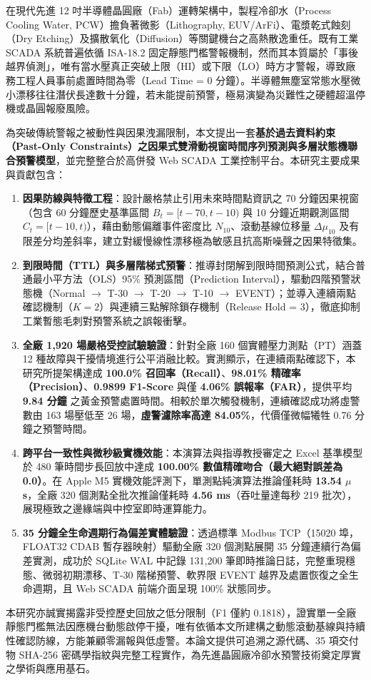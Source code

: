 \documentclass[fontset=none, a4paper, 12pt]{ctexart}
\begin{document}
{\fontsize{12}{20}\selectfont
在現代先進 12 吋半導體晶圓廠（Fab）運轉架構中，製程冷卻水（Process Cooling Water, PCW）擔負著微影（Lithography, EUV/ArFi）、電漿乾式蝕刻（Dry Etching）及擴散氧化（Diffusion）等關鍵機台之高熱散逸重任。既有工業 SCADA 系統普遍依循 ISA-18.2 固定靜態門檻警報機制，然而其本質屬於「事後越界偵測」，唯有當水壓真正突破上限（HI）或下限（LO）時方才警報，導致廠務工程人員事前處置時間為零（Lead Time = 0 分鐘）。半導體無塵室常態水壓微小漂移往往潛伏長達數十分鐘，若未能提前預警，極易演變為災難性之硬體超溫停機或晶圓報廢風險。

為突破傳統警報之被動性與因果洩漏限制，本文提出一套\textbf{基於過去資料約束（Past-Only Constraints）之因果式雙滑動視窗時間序列預測與多層狀態機聯合預警模型}，並完整整合於高併發 Web SCADA 工業控制平台。本研究主要成果與貢獻包含：
\begin{enumerate}
    \item \textbf{因果防線與特徵工程}：設計嚴格禁止引用未來時間點資訊之 70 分鐘因果視窗（包含 60 分鐘歷史基準區間 $B_t=[t-70, t-10)$ 與 10 分鐘近期觀測區間 $C_t=[t-10, t)$），藉由動態偏離事件密度比 $N_{10}$、滾動基線位移量 $\Delta\mu_{10}$ 及有限差分均差斜率，建立對緩慢線性漂移極為敏感且抗高斯噪聲之因果特徵集。
    \item \textbf{到限時間（TTL）與多層階梯式預警}：推導封閉解到限時間預測公式，結合普通最小平方法（OLS）95\% 預測區間（Prediction Interval），驅動四階預警狀態機（Normal $\to$ T-30 $\to$ T-20 $\to$ T-10 $\to$ EVENT）；並導入連續兩點確認機制（$K=2$）與連續三點解除鎖存機制（Release Hold = 3），徹底抑制工業暫態毛刺對預警系統之誤報衝擊。
    \item \textbf{全廠 1,920 場嚴格受控試驗驗證}：針對全廠 160 個實體壓力測點（PT）涵蓋 12 種故障與干擾情境進行公平消融比較。實測顯示，在連續兩點確認下，本研究所提架構達成 \textbf{100.0\% 召回率（Recall）}、\textbf{98.01\% 精確率（Precision）}、\textbf{0.9899 F1-Score} 與僅 \textbf{4.06\% 誤報率（FAR）}，提供平均 \textbf{9.84 分鐘} 之黃金預警處置時間。相較於單次觸發機制，連續確認成功將虛警數由 163 場壓低至 26 場，\textbf{虛警濾除率高達 84.05\%}，代價僅微幅犧牲 0.76 分鐘之預警時間。
    \item \textbf{跨平台一致性與微秒級實機效能}：本演算法與指導教授審定之 Excel 基準模型於 480 筆時間步長回放中達成 \textbf{100.00\% 數值精確吻合（最大絕對誤差為 0.0）}。在 Apple M5 實機效能評測下，單測點純演算法推論僅耗時 \textbf{13.54 $\mu$s}，全廠 320 個測點全批次推論僅耗時 \textbf{4.56 ms}（吞吐量達每秒 219 批次），展現極致之邊緣端與中控室即時運算能力。
    \item \textbf{35 分鐘全生命週期行為偏差實體驗證}：透過標準 Modbus TCP（15020 埠，FLOAT32 CDAB 暫存器映射）驅動全廠 320 個測點展開 35 分鐘連續行為偏差實測，成功於 SQLite WAL 中記錄 131,200 筆即時推論日誌，完整重現穩態、微弱初期漂移、T-30 階梯預警、軟界限 EVENT 越界及處置恢復之全生命週期，且 Web SCADA 前端介面呈現 100\% 狀態同步。
\end{enumerate}

本研究亦誠實揭露非受控歷史回放之低分限制（F1 僅約 0.1818），證實單一全廠靜態門檻無法因應機台動態啟停干擾，唯有依循本文所建構之動態滾動基線與持續性確認防線，方能兼顧零漏報與低虛警。本論文提供可追溯之源代碼、35 項交付物 SHA-256 密碼學指紋與完整工程實作，為先進晶圓廠冷卻水預警技術奠定厚實之學術與應用基石。
\par}
\end{document}

